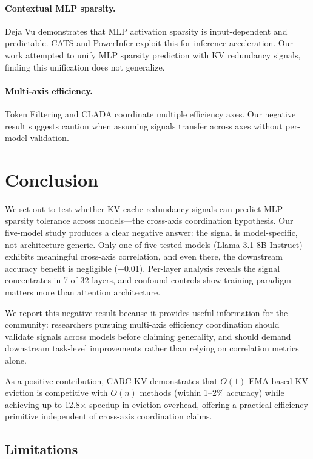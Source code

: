 \documentclass[11pt]{article}
\begin{document}
\paragraph{Contextual MLP sparsity.} Deja Vu \citep{liu2023dejavu} demonstrates that MLP activation sparsity is input-dependent and predictable. CATS \citep{lee2024cats} and PowerInfer \citep{song2024powerinfer} exploit this for inference acceleration. Our work attempted to unify MLP sparsity prediction with KV redundancy signals, finding this unification does not generalize.

\paragraph{Multi-axis efficiency.} Token Filtering \citep{kim2024tokenfiltering} and CLADA \citep{wang2024clada} coordinate multiple efficiency axes. Our negative result suggests caution when assuming signals transfer across axes without per-model validation.

\section{Conclusion}

We set out to test whether KV-cache redundancy signals can predict MLP sparsity tolerance across models---the cross-axis coordination hypothesis. Our five-model study produces a clear negative answer: the signal is model-specific, not architecture-generic. Only one of five tested models (Llama-3.1-8B-Instruct) exhibits meaningful cross-axis correlation, and even there, the downstream accuracy benefit is negligible ($+$0.01). Per-layer analysis reveals the signal concentrates in 7 of 32 layers, and confound controls show training paradigm matters more than attention architecture.

We report this negative result because it provides useful information for the community: researchers pursuing multi-axis efficiency coordination should validate signals across models before claiming generality, and should demand downstream task-level improvements rather than relying on correlation metrics alone.

As a positive contribution, CARC-KV demonstrates that $O(1)$ EMA-based KV eviction is competitive with $O(n)$ methods (within 1--2\% accuracy) while achieving up to 12.8$\times$ speedup in eviction overhead, offering a practical efficiency primitive independent of cross-axis coordination claims.

\subsection*{Limitations}
\end{document}
